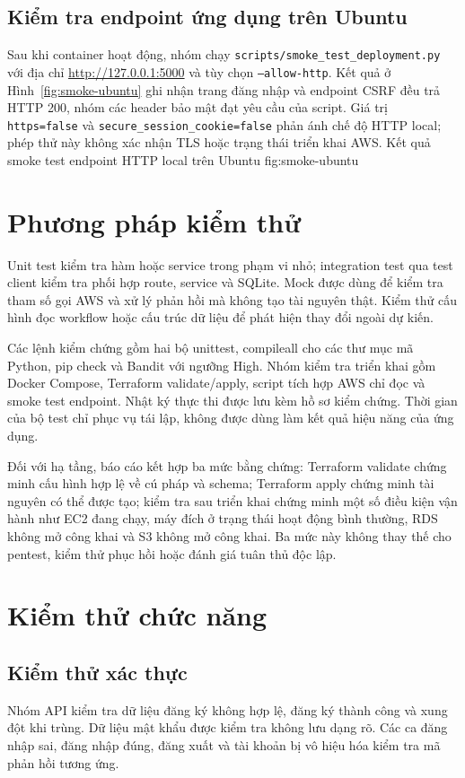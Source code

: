 \subsection{Kiểm tra endpoint ứng dụng trên Ubuntu}
Sau khi container hoạt động, nhóm chạy \texttt{scripts/smoke\_test\_deployment.py} với địa chỉ \url{http://127.0.0.1:5000} và tùy chọn \texttt{--allow-http}. Kết quả ở Hình~\ref{fig:smoke-ubuntu} ghi nhận trang đăng nhập và endpoint CSRF đều trả HTTP 200, nhóm các header bảo mật đạt yêu cầu của script. Giá trị \texttt{https=false} và \texttt{secure\_session\_cookie=false} phản ánh chế độ HTTP local; phép thử này không xác nhận TLS hoặc trạng thái triển khai AWS.
{Kết quả smoke test endpoint HTTP local trên Ubuntu}
{fig:smoke-ubuntu}

\section{Phương pháp kiểm thử}
Unit test kiểm tra hàm hoặc service trong phạm vi nhỏ; integration test qua test client kiểm tra phối hợp route, service và SQLite. Mock được dùng để kiểm tra tham số gọi AWS và xử lý phản hồi mà không tạo tài nguyên thật. Kiểm thử cấu hình đọc workflow hoặc cấu trúc dữ liệu để phát hiện thay đổi ngoài dự kiến.

Các lệnh kiểm chứng gồm hai bộ unittest, compileall cho các thư mục mã Python, pip check và Bandit với ngưỡng High. Nhóm kiểm tra triển khai gồm Docker Compose, Terraform validate/apply, script tích hợp AWS chỉ đọc và smoke test endpoint. Nhật ký thực thi được lưu kèm hồ sơ kiểm chứng. Thời gian của bộ test chỉ phục vụ tái lập, không được dùng làm kết quả hiệu năng của ứng dụng.

Đối với hạ tầng, báo cáo kết hợp ba mức bằng chứng: Terraform validate chứng minh cấu hình hợp lệ về cú pháp và schema; Terraform apply chứng minh tài nguyên có thể được tạo; kiểm tra sau triển khai chứng minh một số điều kiện vận hành như EC2 đang chạy, máy đích ở trạng thái hoạt động bình thường, RDS không mở công khai và S3 không mở công khai. Ba mức này không thay thế cho pentest, kiểm thử phục hồi hoặc đánh giá tuân thủ độc lập.

\section{Kiểm thử chức năng}
\subsection{Kiểm thử xác thực}
Nhóm API kiểm tra dữ liệu đăng ký không hợp lệ, đăng ký thành công và xung đột khi trùng. Dữ liệu mật khẩu được kiểm tra không lưu dạng rõ. Các ca đăng nhập sai, đăng nhập đúng, đăng xuất và tài khoản bị vô hiệu hóa kiểm tra mã phản hồi tương ứng.

